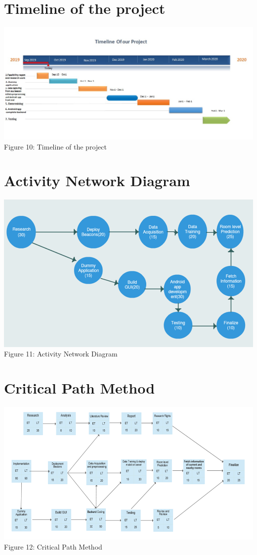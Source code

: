 \documentclass{article}
\begin{document}
\section{Timeline of the project}
\begin{center}
\includegraphics[scale=0.5]{timeline}
\\Figure 10: Timeline of the project
\end{center}

\section{Activity Network Diagram}
\begin{center}
\includegraphics[scale=0.6]{and}
\\Figure 11: Activity Network Diagram
\end{center}

\section{Critical Path Method}
\begin{center}
\includegraphics[scale=0.6]{cpm}
\\Figure 12: Critical Path Method
\end{center}
\end{document}

